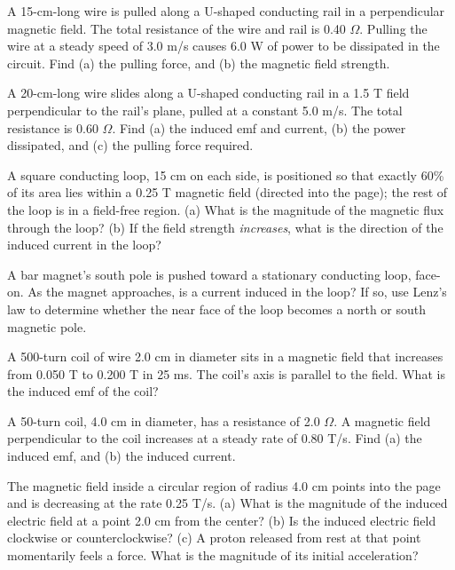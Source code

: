 \documentclass[12pt]{article}
\begin{document}

\clearpage

\prob A 15-cm-long wire is pulled along a U-shaped conducting rail in a
perpendicular magnetic field. The total resistance of the wire and rail is
0.40 $\Omega$. Pulling the wire at a steady speed of 3.0 m/s causes 6.0 W
of power to be dissipated in the circuit. Find (a) the pulling force, and
(b) the magnetic field strength.


\prob A 20-cm-long wire slides along a U-shaped conducting rail in a 1.5 T
field perpendicular to the rail's plane, pulled at a constant 5.0 m/s. The
total resistance is 0.60 $\Omega$. Find (a) the induced emf and current,
(b) the power dissipated, and (c) the pulling force required.


\prob A square conducting loop, 15 cm on each side, is positioned so that
exactly 60\% of its area lies within a 0.25 T magnetic field (directed
into the page); the rest of the loop is in a field-free region. (a) What
is the magnitude of the magnetic flux through the loop? (b) If the field
strength \emph{increases}, what is the direction of the induced current in
the loop?


\prob A bar magnet's south pole is pushed toward a stationary conducting
loop, face-on. As the magnet approaches, is a current induced in the
loop? If so, use Lenz's law to determine whether the near face of the
loop becomes a north or south magnetic pole.


\prob A 500-turn coil of wire 2.0 cm in diameter sits in a magnetic field
that increases from 0.050 T to 0.200 T in 25 ms. The coil's axis is
parallel to the field. What is the induced emf of the coil?


\prob A 50-turn coil, 4.0 cm in diameter, has a resistance of 2.0
$\Omega$. A magnetic field perpendicular to the coil increases at a
steady rate of 0.80 T/s. Find (a) the induced emf, and (b) the induced
current.


\prob The magnetic field inside a circular region of radius 4.0 cm points
into the page and is decreasing at the rate 0.25 T/s. (a) What is the
magnitude of the induced electric field at a point 2.0 cm from the
center? (b) Is the induced electric field clockwise or counterclockwise?
(c) A proton released from rest at that point momentarily feels a force.
What is the magnitude of its initial acceleration?
\end{document}
